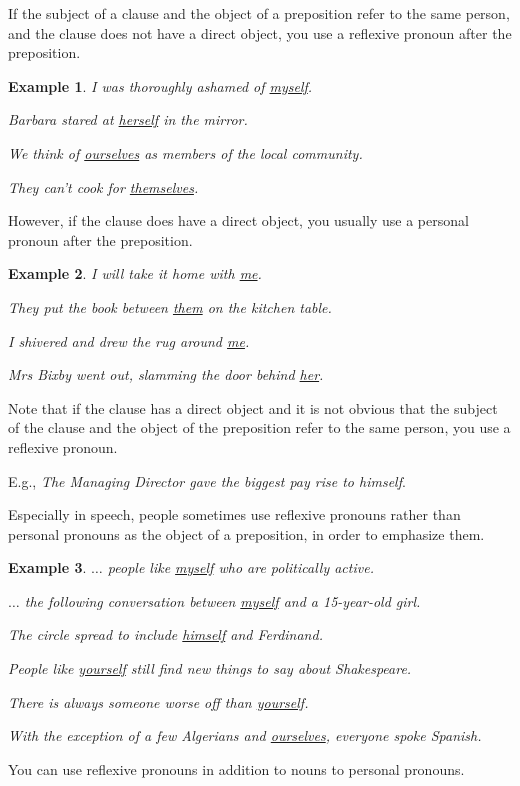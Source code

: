 \documentclass[oneside]{book}
\numberwithin{equation}{section}
\newtheorem{example}{Example}[section]
\begin{document}
%
\noindent{} If the subject of a clause and the object of a preposition refer to the same person, and the clause does not have a direct object, you use a reflexive pronoun after the preposition.
\begin{example}
    I was thoroughly ashamed of \underline{myself}.
    
    Barbara stared at \underline{herself} in the mirror.
    
    We think of \underline{ourselves} as members of the local community.
    
    They can't cook for \underline{themselves}.
\end{example}
However, if the clause does have a direct object, you usually use a personal pronoun after the preposition.
\begin{example}
    I will take it home with \underline{me}.
    
    They put the book between \underline{them} on the kitchen table.
    
    I shivered and drew the rug around \underline{me}.
    
    Mrs Bixby went out, slamming the door behind \underline{her}.
\end{example}
Note that if the clause has a direct object and it is not obvious that the subject of the clause and the object of the preposition refer to the same person, you use a reflexive pronoun.

E.g., \textit{The Managing Director gave the biggest pay rise to himself}.

%
\noindent{} Especially in speech, people sometimes use reflexive pronouns rather than personal pronouns as the object of a preposition, in order to emphasize them.
\begin{example}
    $\ldots$ people like \underline{myself} who are politically active.
    
    $\ldots$ the following conversation between \underline{myself} and a 15-year-old girl.
    
    The circle spread to include \underline{himself} and Ferdinand.
    
    People like \underline{yourself} still find new things to say about Shakespeare.
    
    There is always someone worse off than \underline{yourself}.
    
    With the exception of a few Algerians and \underline{ourselves}, everyone spoke Spanish.
\end{example}
%
\noindent{} You can use reflexive pronouns in addition to nouns to personal pronouns.
\end{document}

